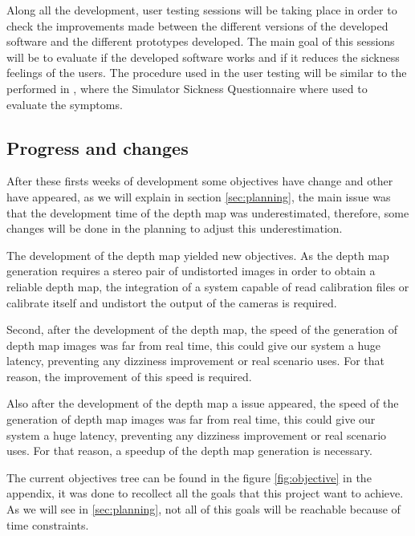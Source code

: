 \documentclass[10pt,a4paper,twocolumn,twoside]{article}
\begin{document}
	Along all the development, user testing sessions will be taking place in order to check the improvements made between the different versions of the developed software and the different prototypes developed. The main goal of this sessions will be to evaluate if the developed software works and if it reduces the sickness feelings of the users. The procedure used in the user testing will be similar to the performed in \cite{ifftConfortDoF}, where the Simulator Sickness Questionnaire \cite{ssqQuestion} where used to evaluate the symptoms. 
	
	\subsection{Progress and changes}
	
	After these firsts weeks of development some objectives have change and other have appeared, as we will explain in section \ref{sec:planning}, the main issue was that the development time of the depth map was underestimated, therefore, some changes will be done in the planning to adjust this underestimation.
	
	The development of the depth map yielded new objectives. As the depth map generation requires a stereo pair of undistorted images in order to obtain a reliable depth map, the integration of a system capable of read calibration files or calibrate itself and undistort the output of the cameras is required.  

	Second, after the development of the depth map, the speed of the generation of depth map images was far from real time, this could give our system a huge latency, preventing any dizziness improvement or real scenario uses. For that reason, the improvement of this speed is required.
	
	Also after the development of the depth map a issue appeared, the speed of the generation of depth map images was far from real time, this could give our system a huge latency, preventing any dizziness improvement or real scenario uses. For that reason, a speedup of the depth map generation is necessary.
	
	
	The current objectives tree can be found in the figure \ref{fig:objective} in the appendix, it was done to recollect all the goals that this project want to achieve. As we will see in \ref{sec:planning}, not all of this goals will be reachable because of time constraints.
	
\end{document}

